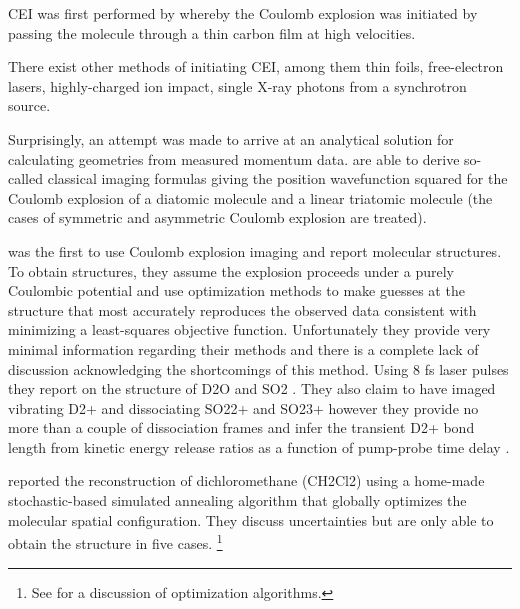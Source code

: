 CEI was first performed by \citet{Vager89} whereby the Coulomb explosion was initiated by passing the molecule through a thin carbon film at high velocities.

There exist other methods of initiating CEI, among them thin foils, free-electron lasers, highly-charged ion impact, single X-ray photons from a synchrotron source.

Surprisingly, an attempt was made to arrive at an analytical solution for calculating geometries from measured momentum data. \citet{Nagaya04}  are able to derive so-called classical imaging formulas giving the position wavefunction squared for the Coulomb explosion of a diatomic molecule and a linear triatomic molecule (the cases of symmetric and asymmetric Coulomb explosion are treated).

\citet{Legare05structure,Legare05dynamics} was the first to use Coulomb explosion imaging and report molecular structures. To obtain structures, they assume the explosion proceeds under a purely Coulombic potential and use optimization methods to make guesses at the structure that most accurately reproduces the observed data consistent with minimizing a least-squares objective function. Unfortunately they provide very minimal information regarding their methods and there is a complete lack of discussion acknowledging the shortcomings of this method. Using 8 fs laser pulses they report on the structure of D2O and SO2 \citep{Legare05structure}. They also claim to have imaged vibrating D2+ and dissociating SO22+ and SO23+ however they provide no more than a couple of dissociation frames and infer the transient D2+ bond length from kinetic energy release ratios as a function of pump-probe time delay \citep{Legare05dynamics}.

\citet{Gagnon08} reported the reconstruction of dichloromethane (CH2Cl2) using a home-made  stochastic-based simulated annealing algorithm that globally optimizes the molecular spatial configuration. They discuss uncertainties but are only able to obtain the structure in five cases. \footnote{See \citet{Bocharova11} for a discussion of optimization algorithms.}

